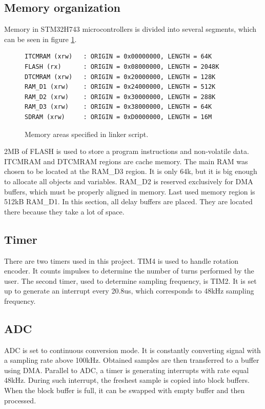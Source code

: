 \documentclass[a4paper,twoside,12pt]{book}
\begin{document}
\subsection{Memory organization}
Memory in STM32H743 microcontrollers is divided into several segments,
which can be seen in figure \ref{fig:mem}.

\begin{figure}[H]
\centering
\begin{lstlisting}
ITCMRAM (xrw)   : ORIGIN = 0x00000000, LENGTH = 64K
FLASH (rx)      : ORIGIN = 0x08000000, LENGTH = 2048K
DTCMRAM (xrw)   : ORIGIN = 0x20000000, LENGTH = 128K
RAM_D1 (xrw)    : ORIGIN = 0x24000000, LENGTH = 512K
RAM_D2 (xrw)    : ORIGIN = 0x30000000, LENGTH = 288K
RAM_D3 (xrw)    : ORIGIN = 0x38000000, LENGTH = 64K
SDRAM (xrw)     : ORIGIN = 0xD0000000, LENGTH = 16M
\end{lstlisting}
\caption{Memory areas specified in linker script.}
\label{fig:mem}
\end{figure}

2MB of FLASH is used to store a program instructions and non-volatile data.
ITCMRAM and DTCMRAM regions are cache memory.
The main RAM was chosen to be located at the RAM\_D3 region.
It is only 64k, but it is big enough to allocate all objects and variables.
RAM\_D2 is reserved exclusively for DMA buffers,
which must be properly aligned in memory.
Last used memory region is 512kB RAM\_D1.
In this section, all delay buffers are placed.
They are located there because they take a lot of space.

\subsection{Timer}
There are two timers used in this project.
TIM4 is used to handle rotation encoder.
It counts impulses to determine the number of turns 
performed by the user.
The second timer, used to determine sampling frequency, is TIM2.
It is set up to generate an interrupt every 20.8us,
which corresponds to 48kHz sampling frequency.

\subsection{ADC}
ADC is set to continuous conversion mode.
It is constantly converting signal with a sampling rate above 100kHz.
Obtained samples are then transferred to a buffer using DMA.
Parallel to ADC, a timer is generating interrupts
with rate equal 48kHz. During such interrupt,
the freshest sample is copied into block buffers. 
When the block buffer is full, it can be swapped with empty buffer
and then processed.
\end{document}
